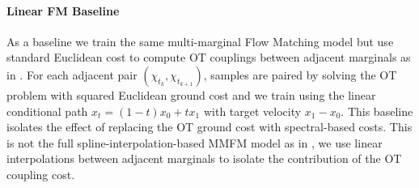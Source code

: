 \paragraph{Linear FM Baseline}
As a baseline we train the same multi-marginal Flow Matching model but use standard Euclidean cost to compute OT couplings between adjacent marginals as in \citet{tongImprovingGeneralizingFlowbased2024}. For each adjacent pair $(\chi_{t_k},\chi_{t_{k+1}})$, samples are paired by solving the OT problem with squared Euclidean ground cost and we train using the linear conditional path $x_t=(1-t)x_0+tx_1$ with target velocity $x_1-x_0$. This baseline isolates the effect of replacing the OT ground cost with spectral-based costs. This is not the full spline-interpolation-based MMFM model as in \citet{rohbeckMODELINGCOMPLEXSYSTEM2025}, we use linear interpolations between adjacent marginals to isolate the contribution of the OT coupling cost.